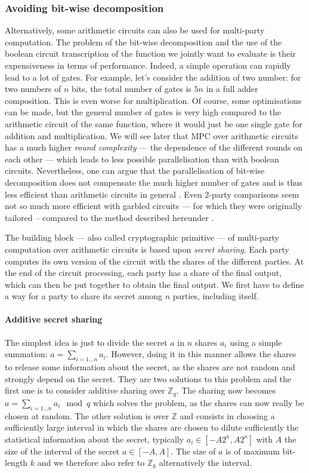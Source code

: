 \subsubsection{Avoiding bit-wise decomposition}
Alternatively, some arithmetic circuits can also be used for multi-party computation. The problem of the bit-wise decomposition and the use of the boolean circuit transcription of the function we jointly want to evaluate is their expensiveness in terms of performance. Indeed, a simple operation can rapidly lead to a lot of gates. For example, let's consider the addition of two number: for two numbers of $n$ bits, the total number of gates is $5n$ in a full adder composition. This is even worse for multiplication. Of course, some optimisations can be made, but the general number of gates is very high compared to the arithmetic circuit of the same function, where it would just be one single gate for addition and multiplication. We will see later that MPC over arithmetic circuits has a much higher \emph{round complexity} --- the dependence of the different rounds on each other --- which leads to less possible parallelisation than with boolean circuits. Nevertheless, one can argue that the parallelisation of bit-wise decomposition does not compensate the much higher number of gates and is thus less efficient than arithmetic circuits in general \cite{Aly2018PracticallyBit-Decomposition}. Even 2-party comparisons seem not so much more efficient with garbled circuits --- for which they were originally tailored -- compared to the method described hereunder \cite{Blom2014AThesis}.

The building block --- also called cryptographic primitive --- of multi-party computation over arithmetic circuits is based upon \emph{secret sharing}. Each party computes its own version of the circuit with the shares of the different parties. At the end of the circuit processing, each party has a share of the final output, which can then be put together to obtain the final output. We first have to define a way for a party to share its secret among $n$ parties, including itself.

\paragraph{Additive secret sharing}
The simplest idea is just to divide the secret $a$ in $n$ shares $a_i$ using a simple summation: $a = \sum_{i=1 \ldots n}a_i$. However, doing it in this manner allows the shares to release some information about the secret, as the shares are not random and strongly depend on the secret. They are two solutions to this problem and the first one is to consider additive sharing over $\mathbb{Z}_q$. The sharing now becomes $a = \sum_{i=1\ldots n}a_i \mod q$ which solves the problem, as the shares can now really be chosen at random. The other solution is over $\mathbb{Z}$ and consists in choosing a sufficiently large interval in which the shares are chosen to dilute sufficiently the statistical information about the secret, typically $a_i \in \left[-A2^\kappa,A2^\kappa\right]$ with $A$ the size of the interval of the secret $a \in \left[-A,A\right]$. The size of $a$ is of maximum bit-length $k$ and we therefore also refer to $\mathbb{Z}_k$ alternatively the interval.


